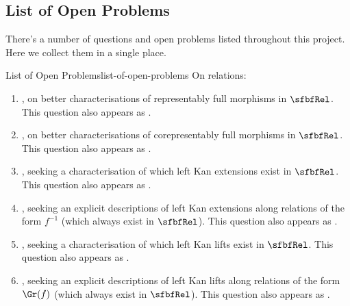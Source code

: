 \subsection{List of Open Problems}\label{subsection-open-problems}
There's a number of questions and open problems listed throughout this project. Here we collect them in a single place.
\begin{remark}{List of Open Problems}{list-of-open-problems}%
    On relations:
    \begin{enumerate}
        \item {}, on better characterisations of representably full morphisms in $\sfbfRel$. This question also appears as \cite{MO467527}.
        \item {}, on better characterisations of corepresentably full morphisms in $\sfbfRel$. This question also appears as \cite{MO467527}.
        \item {}, seeking a characterisation of which left Kan extensions exist in $\sfbfRel$. This question also appears as \cite{MO461592}.
        \item {}, seeking an explicit descriptions of left Kan extensions along relations of the form $f^{-1}$ (which always exist in $\sfbfRel$). This question also appears as \cite{MO461592}.
        \item {}, seeking a characterisation of which left Kan lifts exist in $\sfbfRel$. This question also appears as \cite{MO461592}.
        \item {}, seeking an explicit descriptions of left Kan lifts along relations of the form $\Gr(f)$ (which always exist in $\sfbfRel$). This question also appears as \cite{MO461592}.

\end{enumerate}
\end{remark}
